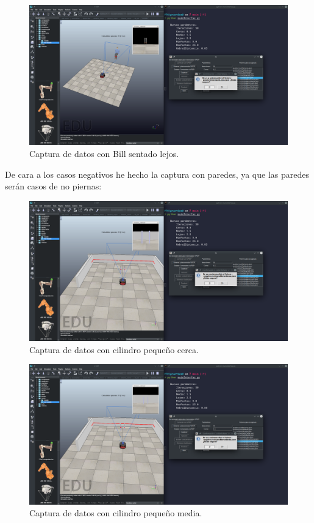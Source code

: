 \documentclass[12pt, spanish]{article}
\begin{document}
\begin{figure}[H]
    \centering
    \includegraphics[width=\textwidth]{sentado_lejos.png}
    \caption{Captura de datos con Bill sentado lejos.}
\end{figure}


De cara a los casos negativos he hecho la captura con paredes, ya que las paredes serán casos de no piernas:


\begin{figure}[H]
    \centering
    \includegraphics[width=\textwidth]{cilindro_p_cerca.png}
    \caption{Captura de datos con cilindro pequeño cerca.}
\end{figure}

\begin{figure}[H]
    \centering
    \includegraphics[width=\textwidth]{cilindro_p_media.png}
    \caption{Captura de datos con cilindro pequeño media.}
\end{figure}
\end{document}
